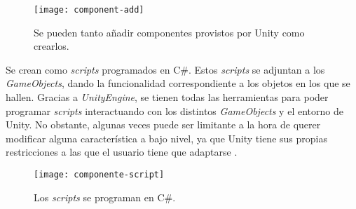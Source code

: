 \begin{figure}[h]
	\centering
	\texttt{[image: component-add]}
	\caption{Se pueden tanto añadir componentes provistos por Unity como crearlos.}
	\label{fig:component-add}
\end{figure}

Se crean como \textit{scripts} programados en C\#. Estos \textit{scripts} se adjuntan a los \textit{GameObjects}, dando la funcionalidad correspondiente a los objetos en los que se hallen. Gracias a \textit{UnityEngine}, se tienen todas las herramientas para poder programar \textit{scripts} interactuando con los distintos \textit{GameObjects} y el entorno de Unity. No obstante, algunas veces puede ser limitante a la hora de querer modificar alguna característica a bajo nivel, ya que Unity tiene sus propias restricciones a las que el usuario tiene que adaptarse \cite{doc:scripts}.

\begin{figure}[h]
	\centering
	\texttt{[image: componente-script]}
	\caption{Los \textit{scripts} se programan en C\#.}
	\label{fig:componente-script}
\end{figure}


